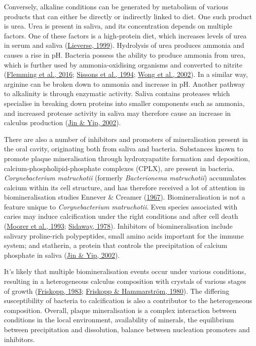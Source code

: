 \documentclass[
  b5paper,
]{book}
\begin{document}
Conversely, alkaline conditions can be generated by metabolism of
various products that can either be directly or indirectly linked to
diet. One such product is urea. Urea is present in saliva, and its
concentration depends on multiple factors. One of these factors is a
high-protein diet, which increases levels of urea in serum and saliva
(\protect\hyperlink{ref-lieverseDietAetiology1999}{Lieverse, 1999}).
Hydrolysis of urea produces ammonia and causes a rise in pH. Bacteria
possess the ability to produce ammonia from urea, which is further used
by ammonia-oxidising organisms and converted to nitrite
(\protect\hyperlink{ref-flemmingBiofilmsEmergent2016}{Flemming et al.,
2016}; \protect\hyperlink{ref-sissonsPHResponse1994}{Sissons et al.,
1994}; \protect\hyperlink{ref-wongCalciumPhosphate2002}{Wong et al.,
2002}). In a similar way, arginine can be broken down to ammonia and
increase in pH. Another pathway to alkalinity is through enzymatic
activity. Saliva contains proteases which specialise in breaking down
proteins into smaller components such as ammonia, and increased protease
activity in saliva may therefore cause an increase in calculus
production (\protect\hyperlink{ref-jinSupragingivalCalculus2002}{Jin \&
Yip, 2002}).

There are also a number of inhibitors and promoters of mineralisation
present in the oral cavity, originating both from saliva and bacteria.
Substances known to promote plaque mineralisation through hydroxyapatite
formation and deposition, calcium-phospholipid-phosphate complexes
(CPLX), are present in bacteria. \emph{Corynebacterium matruchotii}
(formerly \emph{Bacterionema matruchotii}) accumulates calcium within
its cell structure, and has therefore received a lot of attention in
biomineralisation studies Ennever \& Creamer
(\protect\hyperlink{ref-enneverMicrobiologicCalcification1967}{1967}).
Biomineralisation is not a feature unique to \emph{Corynebacterium
matruchotii}. Even species associated with caries may induce
calcification under the right conditions and after cell death
(\protect\hyperlink{ref-moorerCalcificationCariogenic1993}{Moorer et
al., 1993};
\protect\hyperlink{ref-sidawayMicrobiologicalStudy1978a}{Sidaway,
1978}). Inhibitors of biomineralisation include salivary proline-rich
polypeptides, small amino acids important for the immune system; and
statherin, a protein that controls the precipitation of calcium
phosphate in saliva
(\protect\hyperlink{ref-jinSupragingivalCalculus2002}{Jin \& Yip,
2002}).

It's likely that multiple biomineralisation events occur under various
conditions, resulting in a heterogeneous calculus composition with
crystals of various stages of growth
(\protect\hyperlink{ref-friskoppUltrastructureNondecalcified1983}{Friskopp,
1983}; \protect\hyperlink{ref-friskoppComparativeScanning1980}{Friskopp
\& Hammarström, 1980}). The differing susceptibility of bacteria to
calcification is also a contributor to the heterogeneous composition.
Overall, plaque mineralisation is a complex interaction between
conditions in the local environment, availability of minerals, the
equilibrium between precipitation and dissolution, balance between
nucleation promoters and inhibitors.
\end{document}
